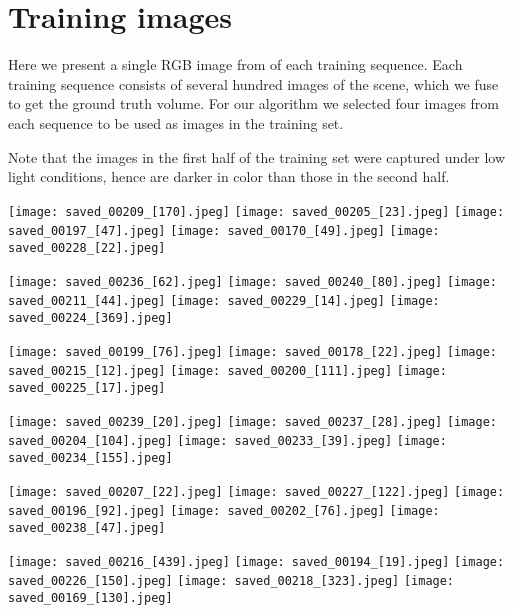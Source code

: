 \documentclass[10pt,onecolumn,letterpaper]{article}
\begin{document}
\section{Training images}
Here we present a single RGB image from of each training sequence.
Each training sequence consists of several hundred images of the scene, which we fuse to get the ground truth volume.
For our algorithm we selected four images from each sequence to be used as images in the training set.

Note that the images in the first half of the training set were captured under low light conditions, hence are darker in color than those in the second half.

\newcommand{\trainwidth}{0.18\columnwidth}

\texttt{[image: saved\_00209\_[170].jpeg]}
\texttt{[image: saved\_00205\_[23].jpeg]}
\texttt{[image: saved\_00197\_[47].jpeg]}
\texttt{[image: saved\_00170\_[49].jpeg]}
\texttt{[image: saved\_00228\_[22].jpeg]}

 \texttt{[image: saved\_00236\_[62].jpeg]}
 \texttt{[image: saved\_00240\_[80].jpeg]}
 \texttt{[image: saved\_00211\_[44].jpeg]}
 \texttt{[image: saved\_00229\_[14].jpeg]}
 \texttt{[image: saved\_00224\_[369].jpeg]}

 \texttt{[image: saved\_00199\_[76].jpeg]}
 \texttt{[image: saved\_00178\_[22].jpeg]}
 \texttt{[image: saved\_00215\_[12].jpeg]}
 \texttt{[image: saved\_00200\_[111].jpeg]}
\texttt{[image: saved\_00225\_[17].jpeg]}

\texttt{[image: saved\_00239\_[20].jpeg]}
\texttt{[image: saved\_00237\_[28].jpeg]}
\texttt{[image: saved\_00204\_[104].jpeg]}
\texttt{[image: saved\_00233\_[39].jpeg]}
\texttt{[image: saved\_00234\_[155].jpeg]}

\texttt{[image: saved\_00207\_[22].jpeg]}
\texttt{[image: saved\_00227\_[122].jpeg]}
\texttt{[image: saved\_00196\_[92].jpeg]}
\texttt{[image: saved\_00202\_[76].jpeg]}
\texttt{[image: saved\_00238\_[47].jpeg]}

\texttt{[image: saved\_00216\_[439].jpeg]}
\texttt{[image: saved\_00194\_[19].jpeg]}
\texttt{[image: saved\_00226\_[150].jpeg]}
\texttt{[image: saved\_00218\_[323].jpeg]}
\texttt{[image: saved\_00169\_[130].jpeg]}
\end{document}
